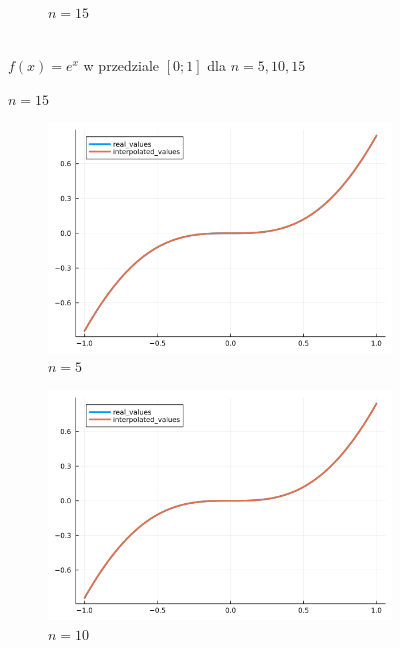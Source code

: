 \documentclass{article}
\def\v{0.47}
\begin{document}
\begin{figure}[H]
\begin{subfigure}[b]{\v\linewidth}
			\caption{$n = 15$}
		\end{subfigure}
	\\{$f(x) = e^x$ w przedziale $[0;1]$ dla $n = 5,10,15$}
	\end{figure}

	\begin{figure}[H]
	    \centering
		\begin{subfigure}[b]{\v\linewidth}
			\includegraphics[width=\linewidth]{graphs/zad5.b.5.png}
			\caption{$n = 5$}
		\end{subfigure}
		\begin{subfigure}[b]{\v\linewidth}
			\includegraphics[width=\linewidth]{graphs/zad5.b.10.png}
			\caption{$n = 10$}
		\end{subfigure}
		\begin{subfigure}[b]{\v\linewidth}

\end{subfigure}
\end{figure}
\end{document}
